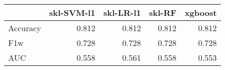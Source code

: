 \begin{tabular}{lrrrr}
\toprule
{} &  skl-SVM-l1 &  skl-LR-l1 &  skl-RF &  xgboost \\
\midrule
Accuracy &       0.812 &      0.812 &   0.812 &    0.812 \\
F1w      &       0.728 &      0.728 &   0.728 &    0.728 \\
AUC      &       0.558 &      0.561 &   0.558 &    0.553 \\
\bottomrule
\end{tabular}

